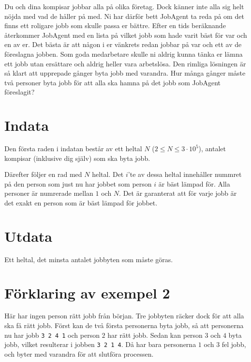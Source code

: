 Du och dina kompisar jobbar alla på olika företag. 
Dock känner inte alla sig helt nöjda med vad de håller på med. 
Ni har därför bett JobAgent ta reda på om det finns ett roligare jobb som skulle passa er bättre.
Efter en tids beräknande återkommer JobAgent med en lista på vilket jobb som hade varit bäst för var och en av er. Det bästa är att någon i er vänkrets redan jobbar på var och ett av de föreslagna jobben. 
Som goda medarbetare skulle ni aldrig kunna tänka er lämna ett jobb utan ersättare och aldrig heller vara arbetslösa.
Den rimliga lösningen är så klart att upprepade gånger byta jobb med varandra.
Hur många gånger måste två personer byta jobb för att alla ska hamna på det jobb som JobAgent föreslagit?

\section*{Indata}
Den första raden i indatan består av ett heltal $N$ ($2 \le N \le 3\cdot10^5$), antalet kompisar (inklusive dig själv) som ska byta jobb.

Därefter följer en rad med $N$ heltal.
Det $i$'te av dessa heltal innehåller nummret på den person som just nu har jobbet som person $i$ är bäst lämpad för.
Alla personer är numrerade mellan $1$ och $N$.
Det är garanterat att för varje jobb är det exakt en person som är bäst lämpad för jobbet.

\section*{Utdata}
Ett heltal, det minsta antalet jobbyten som måste göras. 

\section*{Förklaring av exempel 2}
Här har ingen person rätt jobb från början.
Tre jobbyten räcker dock för att alla ska få rätt jobb.
Först kan de två första personerna byta jobb, så att personerna nu har jobb \texttt{3 2 4 1} och person $2$ har rätt jobb.
Sedan kan person $3$ och $4$ byta jobb, vilket resulterar i jobben \texttt{3 2 1 4}.
Då har bara personerna $1$ och $3$ fel jobb, och byter med varandra för att slutföra processen.
